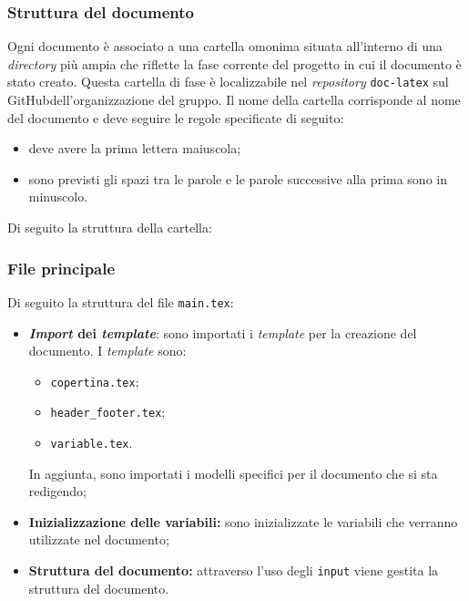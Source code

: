 \subsubsection*{Struttura del documento}
Ogni documento è associato a una cartella omonima situata all'interno di una \textit{directory} più ampia che riflette la fase corrente del progetto in cui il documento è stato creato.
Questa cartella di fase è localizzabile nel \textit{repository\g} \texttt{doc-latex} sul GitHub\g dell'organizzazione del gruppo.
Il nome della cartella corrisponde al nome del documento e deve seguire le regole specificate di seguito:
\begin{itemize}
	\item deve avere la prima lettera maiuscola;
	\item sono previsti gli spazi tra le parole e le parole successive alla prima sono in minuscolo.
\end{itemize}
Di seguito la struttura della cartella:
\vspace{0.5cm}

\subsubsection*{File principale}
Di seguito la struttura del file \texttt{main.tex}:
\begin{itemize}
	\item \textbf{\textit{Import} dei \textit{template}}: sono importati i \textit{template} per la creazione del documento. 
		I \textit{template} sono: 
		\begin{itemize}
			\item \texttt{copertina.tex};
			\item \texttt{header\_footer.tex};
			\item \texttt{variable.tex}.
		\end{itemize}
		In aggiunta, sono importati i modelli specifici per il documento che si sta redigendo;
	\item \textbf{Inizializzazione delle variabili:} sono inizializzate le variabili che verranno utilizzate nel documento;
	\item \textbf{Struttura del documento:} attraverso l'uso degli \texttt{input} viene gestita la struttura del documento.
\end{itemize}

